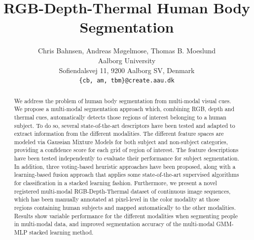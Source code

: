 \documentclass[10pt,twocolumn,letterpaper]{article}
\begin{document}
\title{RGB-Depth-Thermal Human Body Segmentation}

\author{Chris Bahnsen, Andreas Møgelmose, Thomas B. Moeslund\\
Aalborg University\\
Sofiendalsvej 11, 9200 Aalborg SV, Denmark\\
{\tt\small \{cb, am, tbm\}@create.aau.dk}
}

\maketitle

\begin{abstract}
We address the problem of human body segmentation from multi-modal visual cues. We propose a multi-modal segmentation approach which, combining RGB, depth and thermal cues, automatically detects those regions of interest belonging to a human subject. To do so, several state-of-the-art descriptors have been tested and adapted to extract information from the different modalities. The different feature spaces are modeled via Gaussian Mixture Models for both subject and non-subject categories, providing a confidence score for each grid of region of interest. The feature descriptions have been tested independently to evaluate their performance for subject segmentation. In addition, three voting-based heuristic approaches have been proposed, along with a learning-based fusion approach that applies some state-of-the-art supervised algorithms for classification in a stacked learning fashion. Furthermore, we present a novel registered multi-modal RGB-Depth-Thermal dataset of continuous image sequences, which has been manually annotated at pixel-level in the color modality at those regions containing human subjects and mapped automatically to the other modalities. Results show variable performance for the different modalities when segmenting people in multi-modal data, and improved segmentation accuracy of the multi-modal GMM-MLP stacked learning method.
\end{abstract}

\end{document}
